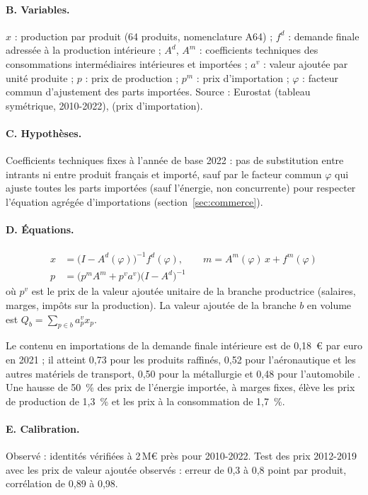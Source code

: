 \paragraph{B. Variables.} $x$ : production par produit (64 produits, nomenclature A64) ; $f^d$ : demande finale
adressée à la production intérieure ; $A^d$, $A^m$ : coefficients techniques des consommations intermédiaires
intérieures et importées ; $a^v$ : valeur ajoutée par unité produite ; $p$ : prix de production ; $p^m$ : prix
d'importation ; $\varphi$ : facteur commun d'ajustement des parts importées. Source : Eurostat
 (tableau symétrique, 2010-2022),  (prix d'importation).

\paragraph{C. Hypothèses.} Coefficients techniques fixes à l'année de base 2022 : pas de substitution entre
intrants ni entre produit français et importé, sauf par le facteur commun $\varphi$ qui ajuste toutes les parts
importées (sauf l'énergie, non concurrente) pour respecter l'équation agrégée d'importations (section~\ref{sec:commerce}).

\paragraph{D. Équations.}
\begin{align}
x &= \bigl(I - A^d(\varphi)\bigr)^{-1} f^d(\varphi), \qquad m = A^m(\varphi)\,x + f^m(\varphi) \\
p &= \bigl(p^m A^m + p^v a^v\bigr)\bigl(I - A^d\bigr)^{-1}
\end{align}
où $p^v$ est le prix de la valeur ajoutée unitaire de la branche productrice (salaires, marges, impôts sur la
production). La valeur ajoutée de la branche $b$ en volume est $Q_b = \sum_{p\in b} a^v_p x_p$.

\begin{exemple}
Le contenu en importations de la demande finale intérieure est de 0,18~€ par euro en 2021 ; il atteint 0,73 pour les
produits raffinés, 0,52 pour l'aéronautique et les autres matériels de transport, 0,50 pour la métallurgie et 0,48 pour
l'automobile . Une hausse de 50~\% des prix de l'énergie importée, à marges fixes, élève les prix de
production de 1,3~\% et les prix à la consommation de 1,7~\%.
\end{exemple}

\paragraph{E. Calibration.} Observé  : identités vérifiées à 2\,M€ près pour 2010-2022. Test des prix
2012-2019 avec les prix de valeur ajoutée observés : erreur de 0,3 à 0,8 point par produit, corrélation de 0,89 à 0,98.

